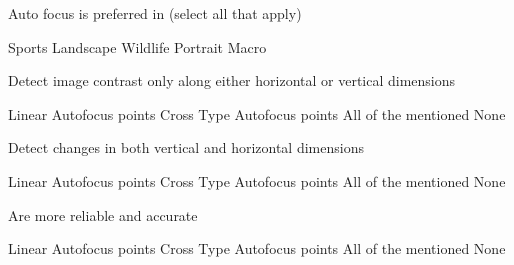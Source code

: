 \documentclass[theme=sleek, randomorder, hidesidemenu]{webquiz}
\begin{document}
\begin{question}
 Auto focus is preferred in (select all that apply)
  \begin{choice}[columns=2, multiple]
    \correct Sports
    \incorrect Landscape
    \correct Wildlife
    \incorrect Portrait
    \incorrect Macro
  \end{choice}
\end{question}

\begin{question}
 Detect image contrast only along either horizontal or vertical dimensions
  \begin{choice}[columns=2]
    \correct Linear Autofocus points
    \incorrect Cross Type Autofocus points
    \incorrect All of the mentioned
    \incorrect None
  \end{choice}
\end{question}

\begin{question}
  Detect changes in both vertical and horizontal dimensions
  \begin{choice}[columns=2]
    \incorrect Linear Autofocus points
    \correct Cross Type Autofocus points
    \incorrect All of the mentioned
    \incorrect None
  \end{choice}
\end{question}

\begin{question}
  Are more reliable and accurate
  \begin{choice}[columns=2]
    \incorrect Linear Autofocus points
    \correct Cross Type Autofocus points
    \incorrect All of the mentioned
    \incorrect None
  \end{choice}
\end{question}
\end{document}
